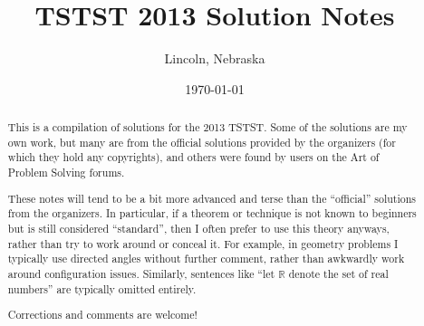\documentclass[11pt]{scrartcl}
\begin{document}
\title{TSTST 2013 Solution Notes}
\subtitle{Lincoln, Nebraska}
\date{\today}

\maketitle
\begin{abstract}
This is a compilation of solutions
for the 2013 TSTST.
Some of the solutions are my own work,
but many are from the official solutions provided by the organizers
(for which they hold any copyrights),
and others were found by users on the Art of Problem Solving forums.

These notes will tend to be a bit more advanced and terse than the ``official''
solutions from the organizers.
In particular, if a theorem or technique is not known to beginners
but is still considered ``standard'', then I often prefer to
use this theory anyways, rather than try to work around or conceal it.
For example, in geometry problems I typically use directed angles
without further comment, rather than awkwardly work around configuration issues.
Similarly, sentences like ``let $\mathbb{R}$ denote the set of real numbers''
are typically omitted entirely.

Corrections and comments are welcome!
\end{abstract}
\tableofcontents
\newpage

\addtocounter{section}{-1}
\end{document}
